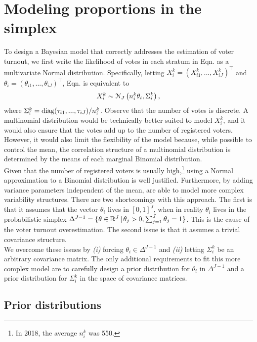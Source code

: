 \documentclass{article}
\begin{document}
\section{Modeling proportions in the simplex} \label{sec:model}


To design a Bayesian model that correctly addresses the estimation of voter turnout, we first write the likelihood of votes in each stratum in Eqn.  as a multivariate Normal distribution. Specifically, letting $X_i^k = (X_{i1}^k,..., X_{iJ}^k)^\top$ and $\theta_i = (\theta_{i1}, ..., \theta_{iJ})^\top$, Eqn.  is equivalent to
\[
  X_i^k \sim \mathcal{N}_J \left( n_i^k \theta_i, \Sigma_i^k \right),
\]
where $\Sigma_i^k = \operatorname{diag}(\tau_{i1}, ..., \tau_{iJ}) / n_i^k$. Observe that the number of votes is discrete. A multinomial distribution would be technically better suited to model $X_i^k$, and it would also ensure that the votes add up to the number of registered voters. However, it would also limit the flexibility of the model because, while possible to control the mean, the correlation structure of a multinomial distribution is determined by the means of each marginal Binomial distribution.
\\


Given that the number of registered voters is usually high,\footnote{In 2018, the average $n_i^k$ was 550.} using a Normal approximation to a Binomial distribution is well justified. Furthermore, by adding variance parameters independent of the mean, \citet{mendoza-nieto2016, diluvi2018} are able to model more complex variability structures. There are two shortcomings with this approach. The first is that it assumes that the vector $\theta_i$ lives in $[0, 1]^J$, when in reality $\theta_i$ lives in the probabilistic simplex $\Delta^{J-1} = \{ \theta \in \mathbb{R}^J \,|\, \theta_j > 0, \sum_{j=1}^J \theta_j = 1 \}$. This is the cause of the voter turnout overestimation. The second issue is that it assumes a trivial covariance structure.
\\


We overcome these issues by \textit{(i)} forcing $\theta_i \in \Delta^{J-1}$ and \textit{(ii)} letting $\Sigma_i^k$ be an arbitrary covariance matrix. The only additional requirements to fit this more complex model are to carefully design a prior distribution for $\theta_i$ in $\Delta^{J-1}$ and a prior distribution for $\Sigma_i^k$ in the space of covariance matrices.


\subsection{Prior distributions}
\end{document}
